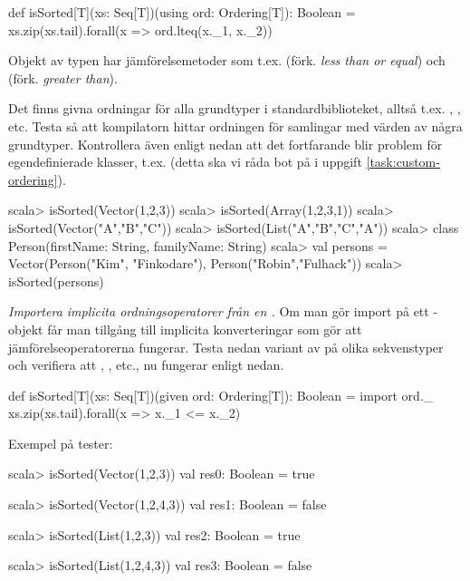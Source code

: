 \begin{CodeSmall}
def isSorted[T](xs: Seq[T])(using ord: Ordering[T]): Boolean =
  xs.zip(xs.tail).forall(x => ord.lteq(x._1, x._2))
\end{CodeSmall}

Objekt av typen  har jämförelsemetoder som t.ex.  (förk. \emph{less than or equal}) och  (förk. \emph{greater than}).

Det finns givna ordningar för alla grundtyper i standardbiblioteket, alltså t.ex. , , etc.
Testa så att kompilatorn hittar ordningen för samlingar med värden av några grundtyper. Kontrollera även enligt nedan att det fortfarande blir problem för egendefinierade klasser, t.ex.   (detta ska vi råda bot på i uppgift \ref{task:custom-ordering}).
\begin{REPL}
scala> isSorted(Vector(1,2,3))
scala> isSorted(Array(1,2,3,1))
scala> isSorted(Vector("A","B","C"))
scala> isSorted(List("A","B","C","A"))
scala> class Person(firstName: String, familyName: String)
scala> val persons = Vector(Person("Kim", "Finkodare"), Person("Robin","Fulhack"))
scala> isSorted(persons)
\end{REPL}

\Subtask \emph{Importera implicita ordningsoperatorer från en .} Om man gör import på ett -objekt får man tillgång till implicita konverteringar som gör att jämförelseoperatorerna fungerar. Testa nedan variant av  på olika sekvenstyper och verifiera att \code{<=}, \code{>}, etc., nu fungerar enligt nedan.
\begin{CodeSmall}
def isSorted[T](xs: Seq[T])(given ord: Ordering[T]): Boolean = {
  import ord._
  xs.zip(xs.tail).forall(x => x._1 <= x._2)
}
\end{CodeSmall}


\SOLUTION

\TaskSolved \what

\SubtaskSolved 

\SubtaskSolved 
Exempel på tester:
\begin{REPL}
scala> isSorted(Vector(1,2,3))
val res0: Boolean = true

scala> isSorted(Vector(1,2,4,3))
val res1: Boolean = false

scala> isSorted(List(1,2,3))
val res2: Boolean = true

scala> isSorted(List(1,2,4,3))
val res3: Boolean = false
\end{REPL}

